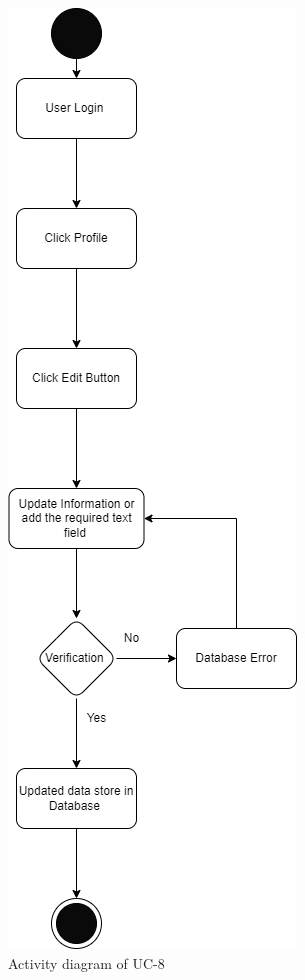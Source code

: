 \begin{figure}[H]
    \centering
    \includegraphics[scale=0.7]{./diagrams/Activity Diagram/ad-08.png}
    \caption{Activity diagram of UC-8}
    \label{fig:act-08}

\end{figure}


